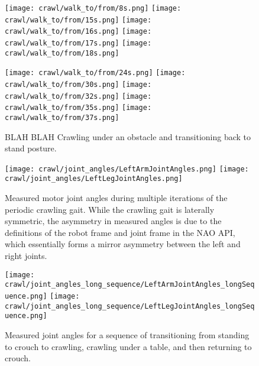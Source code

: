 \begin{figure}
  \centerline{
    \texttt{[image: crawl/walk\_to/from/8s.png]}
    \texttt{[image: crawl/walk\_to/from/15s.png]}
    \texttt{[image: crawl/walk\_to/from/16s.png]}
    \texttt{[image: crawl/walk\_to/from/17s.png]}
    \texttt{[image: crawl/walk\_to/from/18s.png]}
  }
  \vspace*{0.05in}
  \centerline{
    \texttt{[image: crawl/walk\_to/from/24s.png]}
    \texttt{[image: crawl/walk\_to/from/30s.png]}
    \texttt{[image: crawl/walk\_to/from/32s.png]}
    \texttt{[image: crawl/walk\_to/from/35s.png]}
    \texttt{[image: crawl/walk\_to/from/37s.png]}
  }
  \vspace*{-0.05in}
  \caption{BLAH BLAH Crawling under an obstacle and transitioning back to stand posture.}
  \label{fig:nao_crawl4}
  \vspace*{-0.01in}
  \vspace*{-0.05in}
\end{figure}

\begin{figure}
  \centerline{
    \texttt{[image: crawl/joint\_angles/LeftArmJointAngles.png]}
    \texttt{[image: crawl/joint\_angles/LeftLegJointAngles.png]}
  }
  \vspace*{-0.05in}
  \caption{Measured motor joint angles during multiple iterations of the periodic crawling gait.
           While the crawling gait is laterally symmetric, the asymmetry in measured angles is due to the
           definitions of the robot frame and joint frame in the NAO API, which essentially forms a mirror
           asymmetry between the left and right joints.}
  \label{fig:nao_joint_angles1}
  \vspace*{-0.1in}
\end{figure}

\begin{figure}
  \centerline{
    \texttt{[image: crawl/joint\_angles\_long\_sequence/LeftArmJointAngles\_longSequence.png]}
    \texttt{[image: crawl/joint\_angles\_long\_sequence/LeftLegJointAngles\_longSequence.png]}
  }
  \vspace*{-0.05in}
  \caption{Measured joint angles for a sequence of transitioning from standing to crouch to crawling,
           crawling under a table, and then returning to crouch.}
  \label{fig:nao_joint_angles_long_seq}
  \vspace*{-0.2in}
\end{figure}

